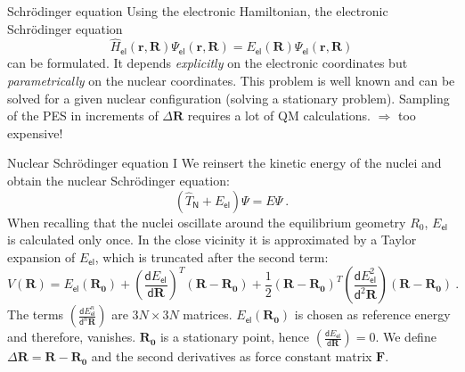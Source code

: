 \documentclass[t]{beamer}
\begin{document}
	\begin{frame}{Schrödinger equation}
	    Using the electronic Hamiltonian, the electronic Schrödinger equation
        \begin{equation*}
            \hat{H}_\mathsf{el}(\mathbf{r,R}) \Psi_\mathsf{el}(\mathbf{r,R}) = E_\mathsf{el}(\mathbf{R}) \Psi_\mathsf{el}(\mathbf{r,R})
        \end{equation*}
        can be formulated. It depends \textit{explicitly} on the electronic coordinates but \textit{parametrically} on the nuclear coordinates.
        \newline
        \newline
        This problem is well known and can be solved for a given nuclear configuration (solving a stationary problem). Sampling of the PES in increments of $\Delta \mathbf{R}$ requires a lot of QM calculations.
        \newline
        \newline
        $\Longrightarrow$ too expensive!
	\end{frame}
	\begin{frame}{Nuclear Schrödinger equation I}
	    We reinsert the kinetic energy of the nuclei and obtain the nuclear Schrödinger equation:
	    \begin{equation*}
	        (\hat{T}_\mathsf{N} + E_\mathsf{el}) \Psi = E\Psi~.
	    \end{equation*}
	    When recalling that the nuclei oscillate around the equilibrium geometry $R_0$, $E_\mathsf{el}$ is calculated only once. In the close vicinity it is approximated by a Taylor expansion of $E_\mathsf{el}$, which is truncated after the second term:
	    \begin{equation*}
	        V(\mathbf{R}) = E_\mathsf{el}(\mathbf{R_0}) + \left( \frac{\mathsf{d} E_\mathsf{el}}{\mathsf{d} \mathbf{R}}\right)^T (\mathbf{R - R_0}) + \frac{1}{2}(\mathbf{R - R_0})^T \left( \frac{\mathsf{d} E_\mathsf{el}^2}{\mathsf{d}^2 \mathbf{R}}\right) (\mathbf{R - R_0})~.
	    \end{equation*}
	    The terms $\left( \frac{\mathsf{d} E_\mathsf{el}^n}{\mathsf{d}^n \mathbf{R}}\right)$ are $3N \times 3N$ matrices. $E_\mathsf{el}(\mathbf{R_0})$ is chosen as reference energy and therefore, vanishes. $\mathbf{R_0}$ is a stationary point, hence $\left( \frac{\mathsf{d} E_\mathsf{el}}{\mathsf{d} \mathbf{R}}\right) = 0$. We define $\Delta \mathbf{R = R - R_0}$ and the second derivatives as force constant matrix $\mathbf{F}$.
	\end{frame}
\end{document}
